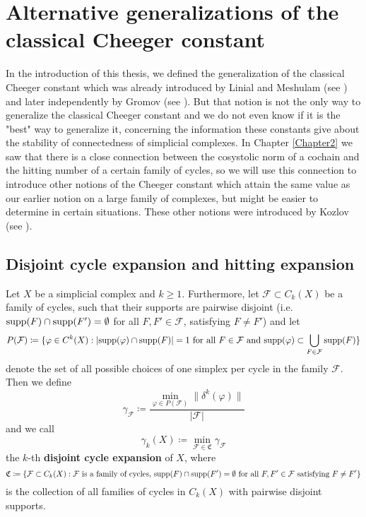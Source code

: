 
\chapter{Alternative generalizations of the classical Cheeger constant}

\label{Chapter6}

In the introduction of this thesis, we defined the generalization of the classical Cheeger constant which was already introduced by Linial and Meshulam (see \cite{2}) and later independently by Gromov (see \cite{3}). But that notion is not the only way to generalize the classical Cheeger constant and we do not even know if it is the "best" way to generalize it, concerning the information these constants give about the stability of connectedness of simplicial complexes. In Chapter \ref{Chapter2} we saw that there is a close connection between the cosystolic norm of a cochain and the hitting number of a certain family of cycles, so we will use this connection to introduce other notions of the Cheeger constant which attain the same value as our earlier notion on a large family of complexes, but might be easier to determine in certain situations. These other notions were introduced by Kozlov (see \cite{13}).

\section{Disjoint cycle expansion and hitting expansion}

\begin{defi}\label{definition411}
Let \(X\) be a simplicial complex and \(k\geq 1\). Furthermore, let \(\mathcal{F}\subset C_k(X)\) be a family of cycles, such that their supports are pairwise disjoint (i.e. \(\mathrm{supp}(F)\cap\mathrm{supp}(F')=\emptyset\) for all \(F,F'\in\mathcal{F}\), satisfying \(F\neq F'\)) and let
\[
P(\mathcal{F})\coloneqq\{\varphi\in C^k(X):|\mathrm{supp}(\varphi)\cap\mathrm{supp}(F)|=1\text{ for all }F\in\mathcal{F}\text{ and }\mathrm{supp}(\varphi)\subset\bigcup\limits_{F\in\mathcal{F}}\mathrm{supp}(F)\}
\]
denote the set of all possible choices of one simplex per cycle in the family \(\mathcal{F}\). Then we define
\[
\gamma_{\mathcal{F}}\coloneqq\frac{\min\limits_{\varphi\in P(\mathcal{F})}\|\delta^k(\varphi)\|}{|\mathcal{F}|}
\]
and we call
\[
\gamma_k(X)\coloneqq\min\limits_{\mathcal{F}\in\mathfrak{C}}\gamma_{\mathcal{F}}
\]
the \(k\)-th \textbf{disjoint cycle expansion} of \(X\), where 
\[
\mathfrak{C}\coloneqq\{\mathcal{F}\subset C_k(X):\mathcal{F}\text{ is a family of cycles, }\mathrm{supp}(F)\cap\mathrm{supp}(F')=\emptyset\text{ for all }F,F'\in\mathcal{F}\text{ satisfying }F\neq F'\}
\]
is the collection of all families of cycles in \(C_k(X)\) with pairwise disjoint supports.
\end{defi}

